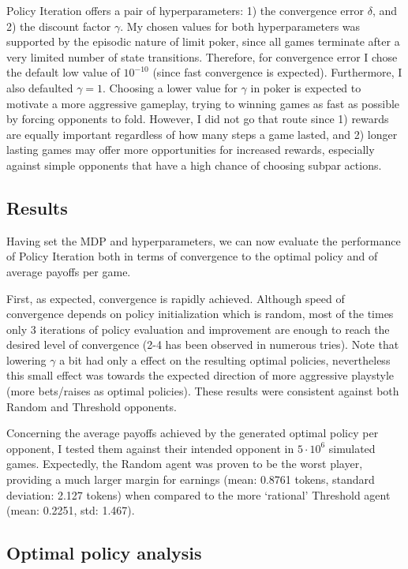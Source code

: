 Policy Iteration offers a pair of hyperparameters: 1) the convergence error $\delta$, and 2) the discount factor $\gamma$. My chosen values for both hyperparameters was supported by the episodic nature of limit poker, since all games terminate after a very limited number of state transitions. Therefore, for convergence error I chose the default low value of $10^{-10}$ (since fast convergence is expected). Furthermore, I also defaulted $\gamma=1$. Choosing a lower value for $\gamma$ in poker is expected to motivate a more aggressive gameplay, trying to winning games as fast as possible by forcing opponents to fold. However, I did not go that route since 1) rewards are equally important regardless of how many steps a game lasted, and 2) longer lasting games may offer more opportunities for increased rewards, especially against simple opponents that have a high chance of choosing subpar actions.

\subsection{Results}

Having set the MDP and hyperparameters, we can now evaluate the performance of Policy Iteration both in terms of convergence to the optimal policy and of average payoffs per game.

First, as expected, convergence is rapidly achieved. Although speed of convergence depends on policy initialization which is random, most of the times only 3 iterations of policy evaluation and improvement are enough to reach the desired level of convergence (2-4 has been observed in numerous tries). Note that lowering $\gamma$ a bit had only a effect on the resulting optimal policies, nevertheless this small effect was towards the expected direction of more aggressive playstyle (more bets/raises as optimal policies). These results were consistent against both Random and Threshold opponents.

Concerning the average payoffs achieved by the generated optimal policy per opponent, I tested them against their intended opponent in $5\cdot10^6$ simulated games. Expectedly, the Random agent was proven to be the worst player, providing a much larger margin for earnings (mean: 0.8761 tokens, standard deviation: 2.127 tokens) when compared to the more `rational' Threshold agent (mean: 0.2251, std: 1.467). 

\subsection{Optimal policy analysis}

